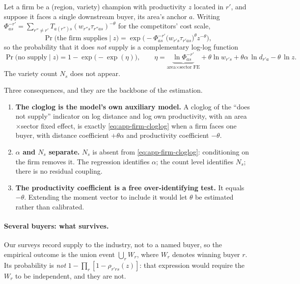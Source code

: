 \begin{proposition}
\label{prop:firm}
Let a firm be a (region, variety) champion with productivity $z$ located in $r'$, and suppose it
faces a single downstream buyer, its area's anchor $a$. Writing
$\Phi^{-r'}_{as}=\sum_{r''\neq r'}T_{a(r'')s}(w_{r''s}\tau_{r''as})^{-\theta}$ for the
competitors' cost scale,
\begin{equation}
\Pr\big(\text{the firm supplies}\mid z\big)
=\exp\Big(-\Phi^{-r'}_{as}\big(w_{r's}\tau_{r'as}\big)^{\theta}z^{-\theta}\Big),
\label{eq:app-firm-win}
\end{equation}
so the probability that it does \emph{not} supply is a complementary log-log function
\begin{equation}
\Pr\big(\text{no supply}\mid z\big)=1-\exp\big(-\exp(\eta)\big),
\qquad
\eta=\underbrace{\ln\Phi^{-r'}_{as}}_{\text{area}\times\text{sector FE}}
+\theta\ln w_{r's}
+\theta\alpha\,\ln d_{r'a}
-\theta\,\ln z .
\label{eq:app-firm-cloglog}
\end{equation}
The variety count $N_{s}$ does not appear.
\end{proposition}

Three consequences, and they are the backbone of the estimation.

\begin{enumerate}[nosep,topsep=3pt,label=(\alph*)]
\item \textbf{The cloglog is the model's own auxiliary model.} A cloglog of the ``does not
supply'' indicator on log distance and log own productivity, with an area$\times$sector fixed
effect, is exactly \eqref{eq:app-firm-cloglog} when a firm faces one buyer, with distance
coefficient $+\theta\alpha$ and productivity coefficient $-\theta$.
\item \textbf{$\alpha$ and $N_{s}$ separate.} $N_{s}$ is absent from
\eqref{eq:app-firm-cloglog}: conditioning on the firm removes it. The regression identifies
$\alpha$; the count level identifies $N_{s}$; there is no residual coupling.
\item \textbf{The productivity coefficient is a free over-identifying test.} It equals
$-\theta$. Extending the moment vector to include it would let $\theta$ be estimated rather than
calibrated.
\end{enumerate}

\paragraph{Several buyers: what survives.} Our surveys record supply to the industry, not to a
named buyer, so the empirical outcome is the union event $\bigcup_{r}W_{r}$, where $W_{r}$
denotes winning buyer $r$. Its probability is \emph{not} $1-\prod_{r}[1-\rho_{r'rs}(z)]$: that
expression would require the $W_{r}$ to be independent, and they are not.

